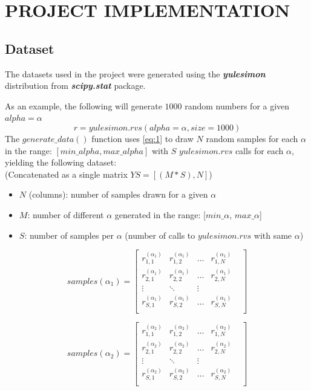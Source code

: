 \documentclass[a4paper, 12pt]{report}
\begin{document}
\chapter{PROJECT IMPLEMENTATION}

\section{Dataset}
\label{dataset}

\par The datasets used in the project were generated using the \textbf{\textit{yulesimon}} distribution from \textbf{\textit{scipy.stat}} package.

\par As an example, the following will generate $1000$ random numbers for a given $alpha=\alpha$
\begin{equation}
\label{eq:1}
r = yulesimon.rvs(alpha=\alpha, size=1000)
\end{equation}
The $generate\_data()$ function uses \ref{eq:1} to draw $N$ random samples for each $\alpha$ in the range: $[min\_alpha, max\_alpha]$ with $S$ $yulesimon.rvs$ calls for each $\alpha$, yielding the following dataset:\\
(Concatenated as a single matrix $YS = [(M * S), N]$)
\begin{itemize}
  \item $N$ (columns): number of samples drawn for a given $\alpha$
  \item $M$: number of different $\alpha$ generated in the range: [$min\_\alpha$, $max\_\alpha$]
  \item $S$: number of samples per $\alpha$ (number of calls to $yulesimon.rvs$ with same $\alpha$)
\end{itemize}

\[
samples(\alpha_1) = \begin{bmatrix} 
    r^{(\alpha_1)}_{1,1} & r^{(\alpha_1)}_{1,2} & \dots & r^{(\alpha_1)}_{1,N} & \\
    r^{(\alpha_1)}_{2,1} & r^{(\alpha_1)}_{2,2} & \dots & r^{(\alpha_1)}_{2,N} & \\
    \vdots & \ddots & \vdots & \\
    r^{(\alpha_1)}_{S,1} & r^{(\alpha_1)}_{S,2} & \dots & r^{(\alpha_1)}_{S,N} & \\
\end{bmatrix}
\]

\[
samples(\alpha_2) = \begin{bmatrix} 
    r^{(\alpha_2)}_{1,1} & r^{(\alpha_2)}_{1,2} & \dots & r^{(\alpha_2)}_{1,N} & \\
    r^{(\alpha_2)}_{2,1} & r^{(\alpha_2)}_{2,2} & \dots & r^{(\alpha_2)}_{2,N} & \\
    \vdots & \ddots & \vdots & \\
    r^{(\alpha_2)}_{S,1} & r^{(\alpha_2)}_{S,2} & \dots & r^{(\alpha_2)}_{S,N} & \\
\end{bmatrix}
\]
\end{document}
